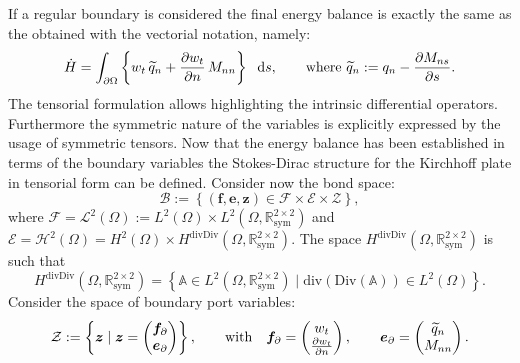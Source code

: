 \documentclass[preprint,12pt]{elsarticle}
\begin{document}
If a regular boundary is considered the final energy balance is exactly the same as the obtained with the vectorial notation, namely:
\begin{equation}
\dot{H} = \int_{\partial \Omega} \left\{ w_t \, \widetilde{q}_n + \diffp{w_t}{n} \, M_{nn}\right\} \ \d{s},  \qquad \text{where }\widetilde{q}_n := q_n - \diffp{M_{ns}}{s}.
\end{equation} 
The tensorial formulation allows highlighting the intrinsic differential operators. Furthermore the symmetric nature of the variables is explicitly expressed by the usage of symmetric tensors. {Now that the energy balance has been established in terms of the boundary variables the Stokes-Dirac structure for the Kirchhoff plate in tensorial form can be defined. Consider now the bond space:
\begin{equation}
\label{eq:bondKir}
\mathcal{B} := \left\{(\bm{f}, \bm{e}, \bm{z}) \in \mathcal{F} \times \mathcal{E} \times \mathcal{Z} \right\},
\end{equation}
where $\mathcal{F}=  \mathscr{L}^2(\Omega) :=  L^2(\Omega) \times L^2(\Omega, \mathbb{R}^{2 \times 2}_{\text{sym}})$ and $ \mathcal{E} =  \mathscr{H}^2(\Omega) = H^{2}(\Omega) \times H^{\text{divDiv}}(\Omega, \mathbb{R}^{2 \times 2}_{\text{sym}})$. The space $H^{\text{divDiv}}(\Omega, \mathbb{R}^{2 \times 2}_{\text{sym}})$ is such that
\[
H^{\text{divDiv}}(\Omega, \mathbb{R}^{2 \times 2}_{\text{sym}}) = \left\{ \mathbb{A} \in L^2(\Omega, \mathbb{R}^{2 \times 2}_{\text{sym}}) \; \vert \; \mathrm{div}(\mathrm{Div}(\mathbb{A})) \in L^2(\Omega) \right\}.
\] Consider the space of boundary port variables:
\begin{equation}
\begin{gathered}
\mathcal{Z} := \left\{ \bm{z} \; \vert \; \bm{z} = \begin{pmatrix} \bm{f}_{\partial} \\ \bm{e}_{\partial} \end{pmatrix} \right\}, \qquad \text{with} \quad
\bm{f}_\partial = 
\begin{pmatrix}
w_t \\ \diffp{w_t}{n} \\
\end{pmatrix}, \qquad
\bm{e}_\partial = 
\begin{pmatrix}
\widetilde{q}_n \\ M_{nn} \\
\end{pmatrix}.
\end{gathered}
\end{equation}
}
\end{document}
